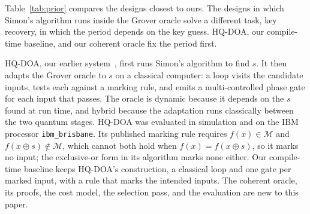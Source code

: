\documentclass[journal]{IEEEtran}
\begin{document}
Table~\ref{tab:prior} compares the designs closest to ours. The designs in which
Simon's algorithm runs inside the Grover oracle solve a different task, key
recovery, in which the period depends on the key guess. HQ-DOA, our
compile-time baseline, and our coherent oracle fix the period first.

HQ-DOA, our earlier system~\cite{patil2026quantum}, first runs Simon's algorithm
to find $s$. It then adapts the Grover oracle to $s$ on a classical
computer: a loop visits the candidate inputs, tests each against a marking rule,
and emits a multi-controlled phase gate for each input that passes. The oracle is
dynamic because it depends on the $s$ found at run time, and hybrid because the
adaptation runs classically between the two quantum stages. HQ-DOA was evaluated
in simulation and on the IBM processor \texttt{ibm\_brisbane}. Its published
marking rule requires $f(x)\in\mathcal{M}$ and
$f(x\oplus s)\notin\mathcal{M}$, which cannot both hold when $f(x)=f(x\oplus s)$,
so it marks no input; the exclusive-or form in its algorithm marks none either.
Our compile-time baseline keeps HQ-DOA's construction, a classical loop
and one gate per marked input, with a rule that marks the intended inputs. The
coherent oracle, its proofs, the cost model, the selection pass, and the
evaluation are new to this paper.
\end{document}
